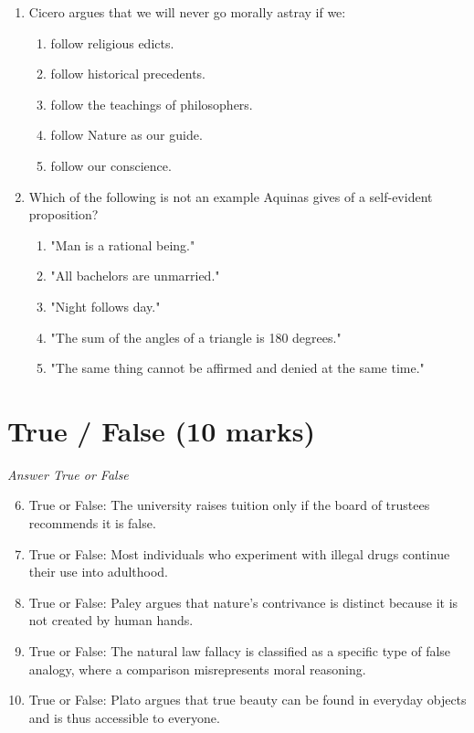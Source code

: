 \documentclass[12pt]{article}
\begin{document}
\begin{enumerate}[label=\arabic*.]
\item Cicero argues that we will never go morally astray if we:
\begin{enumerate}[label=(\alph*)]
    \item follow religious edicts.
    \item follow historical precedents.
    \item follow the teachings of philosophers.
    \item follow Nature as our guide.
    \item follow our conscience.
\end{enumerate}
\item Which of the following is not an example Aquinas gives of a self-evident proposition?
\begin{enumerate}[label=(\alph*)]
    \item "Man is a rational being."
    \item "All bachelors are unmarried."
    \item "Night follows day."
    \item "The sum of the angles of a triangle is 180 degrees."
    \item "The same thing cannot be affirmed and denied at the same time."
\end{enumerate}
\end{enumerate}

\section*{True / False (10 marks)}
\textit{Answer True or False}
\begin{enumerate}[label=\arabic*.]
\setcounter{enumi}{5}
\item True or False: The university raises tuition only if the board of trustees recommends it is false.
\item True or False: Most individuals who experiment with illegal drugs continue their use into adulthood.
\item True or False: Paley argues that nature's contrivance is distinct because it is not created by human hands.
\item True or False: The natural law fallacy is classified as a specific type of false analogy, where a comparison misrepresents moral reasoning.
\item True or False: Plato argues that true beauty can be found in everyday objects and is thus accessible to everyone.
\end{enumerate}
\end{document}
